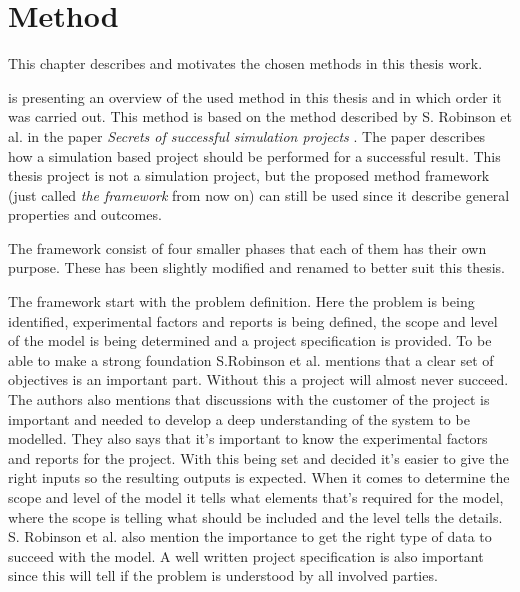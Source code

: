 \chapter{Method}\label{method}
This chapter describes and motivates the chosen methods in this thesis work.


 is presenting an overview of the used method in this thesis and in which order it was carried out.
This method is based on the method described by S. Robinson et al. in the paper \textit{Secrets of successful simulation projects} \cite{SecretsSuccessfulSimulation1995}.
The paper describes how a simulation based project should be performed for a successful result.
This thesis project is not a simulation project, but the proposed method framework (just called \textit{the framework} from now on) can still be used since it describe general properties and outcomes.

\bigskip

The framework consist of four smaller phases that each of them has their own purpose.
These has been slightly modified and renamed to better suit this thesis.

\bigskip

The framework start with the problem definition.
Here the problem is being identified, experimental factors and reports is being defined, the scope and level of the model is being determined and a project specification is provided.
To be able to make a strong foundation S.Robinson et al. mentions that a clear set of objectives is an important part. 
Without this a project will almost never succeed.
The authors also mentions that discussions with the customer of the project is important and needed to develop a deep understanding of the system to be modelled.
They also says that it's important to know the experimental factors and reports for the project.
With this being set and decided it's easier to give the right inputs so the resulting outputs is expected.
When it comes to determine the scope and level of the model it tells what elements that's required for the model, where the scope is telling what should be included and the level tells the details.
S. Robinson et al. also mention the importance to get the right type of data to succeed with the model. 
A well written project specification is also important since this will tell if the problem is understood by all involved parties.

\bigskip


